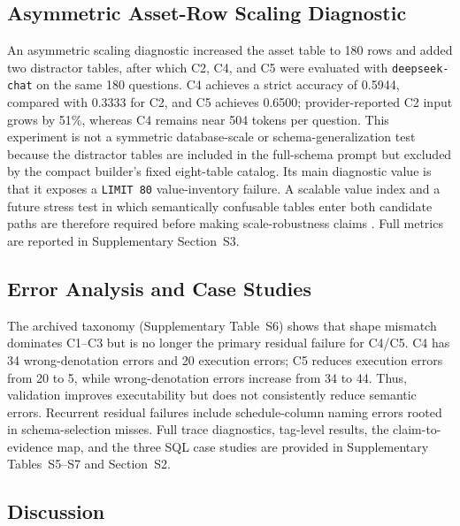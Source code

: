 \documentclass[cmc,article,submit,moreauthors,pdftex]{Definitions/tsp}
\begin{document}
\subsection{Asymmetric Asset-Row Scaling Diagnostic}\label{scale-robustness}

An asymmetric scaling diagnostic increased the asset table to 180 rows and added two distractor tables, after which C2, C4, and C5 were evaluated with \texttt{deepseek-chat} on the same 180 questions. C4 achieves a strict accuracy of 0.5944, compared with 0.3333 for C2, and C5 achieves 0.6500; provider-reported C2 input grows by 51\%, whereas C4 remains near 504 tokens per question. This experiment is not a symmetric database-scale or schema-generalization test because the distractor tables are included in the full-schema prompt but excluded by the compact builder's fixed eight-table catalog. Its main diagnostic value is that it exposes a \texttt{LIMIT 80} value-inventory failure. A scalable value index and a future stress test in which semantically confusable tables enter both candidate paths are therefore required before making scale-robustness claims \cite{talaei2024chess}. Full metrics are reported in Supplementary Section~S3.

\subsection{Error Analysis and Case Studies}\label{sect:r5}

The archived taxonomy (Supplementary Table~S6) shows that shape mismatch dominates C1--C3 but is no longer the primary residual failure for C4/C5. C4 has 34 wrong-denotation errors and 20 execution errors; C5 reduces execution errors from 20 to 5, while wrong-denotation errors increase from 34 to 44. Thus, validation improves executability but does not consistently reduce semantic errors. Recurrent residual failures include schedule-column naming errors rooted in schema-selection misses. Full trace diagnostics, tag-level results, the claim-to-evidence map, and the three SQL case studies are provided in Supplementary Tables~S5--S7 and Section~S2.

\subsection{Discussion}\label{sect:r6}
\end{document}
